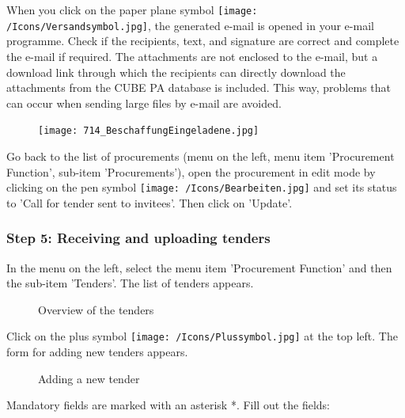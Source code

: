 \vspace{\baselineskip}

When you click on the paper plane symbol \texttt{[image: /Icons/Versandsymbol.jpg]}, the generated e-mail is opened in your e-mail programme. Check if the recipients, text, and signature are correct and complete the e-mail if required. The attachments are not enclosed to the e-mail, but a download link through which the recipients can directly download the attachments from the CUBE PA database is included. This way, problems that can occur when sending large files by e-mail are avoided.

\begin{figure}
\vspace{-15pt}
\texttt{[image: 714\_BeschaffungEingeladene.jpg]}
\end{figure}

Go back to the list of procurements (menu on the left, menu item 'Procurement Function', sub-item 'Procurements'), open the procurement in edit mode by clicking on the pen symbol \texttt{[image: /Icons/Bearbeiten.jpg]} and set its status to 'Call for tender sent to invitees'. Then click on 'Update'.

\vspace{\baselineskip}

\subsubsection{Step 5: Receiving and uploading tenders}

In the menu on the left, select the menu item 'Procurement Function' and then the sub-item 'Tenders'. The list of tenders appears.

\begin{figure}[H]
\caption{Overview of the tenders}
\end{figure}

Click on the plus symbol \texttt{[image: /Icons/Plussymbol.jpg]}  at the top left. The form for adding new tenders appears.

\begin{figure}[H]
\caption{Adding a new tender}
\end{figure}


Mandatory fields are marked with an asterisk *. Fill out the fields:

